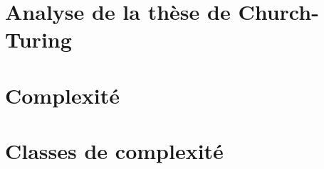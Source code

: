 \section{Analyse de la thèse de Church-Turing}




\section{Complexité}




\section{Classes de complexité}

